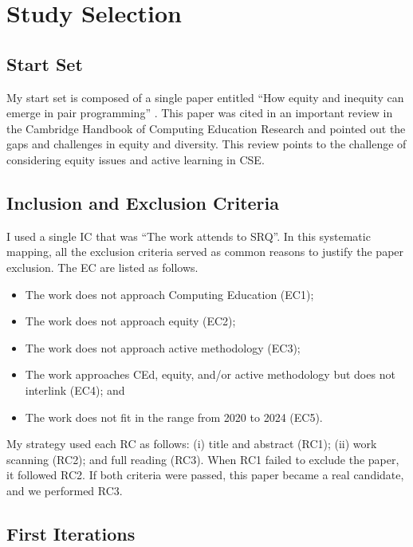 \section{Study Selection}
\label{rel-work:study-selection}

\subsection{Start Set}
\label{rel-work-ss:start-set}

My start set is composed of a single paper entitled “How equity and inequity can emerge in pair programming” \cite{lewis:2015}. This paper was cited in an important review in the Cambridge Handbook of Computing Education Research \cite{lewis:2019} and pointed out the gaps and challenges in equity and diversity. This review points to the challenge of considering equity issues and active learning in \gls{CSE}.

\subsection{Inclusion and Exclusion Criteria}
\label{rel-work-ss:inc-exc-criteria}

I used a single \gls{IC} that was “The work attends to \gls{SRQ}”. In this systematic mapping, all the exclusion criteria served as common reasons to justify the paper exclusion. The \gls{EC} are listed as follows.
\begin{itemize}
    \item The work does not approach Computing Education (\gls{EC}1);
    \item The work does not approach equity (\gls{EC}2);
    \item The work does not approach active methodology (\gls{EC}3);
    \item The work approaches \gls{CEd}, equity, and/or active methodology but does not interlink (\gls{EC}4); and
    \item The work does not fit in the range from 2020 to 2024 (\gls{EC}5).
\end{itemize}

My strategy used each \gls{RC} as follows: (i) title and abstract (\gls{RC}1); (ii) work scanning (\gls{RC}2); and full reading (\gls{RC}3). When \gls{RC}1 failed to exclude the paper, it followed \gls{RC}2. If both criteria were passed, this paper became a real candidate, and we performed \gls{RC}3. 

\subsection{First Iterations}
\label{rel-work-ss:first-iterations}

